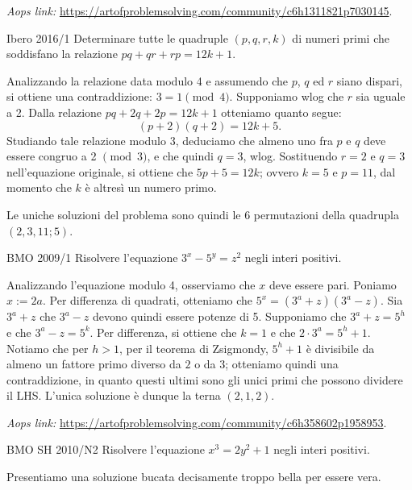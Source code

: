 \documentclass{article}
\begin{document}
\vspace{0.5cm}
\textit{Aops link:}
\href{https://artofproblemsolving.com/community/c6h1311821p7030145}
{https://artofproblemsolving.com/community/c6h1311821p7030145}.

\begin{proposition}{Ibero 2016/1}{}
	Determinare tutte le quadruple $(p,q,r,k)$ di numeri primi
	che soddisfano la relazione $pq+qr+rp=12k+1$.
\end{proposition}

Analizzando la relazione data modulo 4 e assumendo
che $p$, $q$ ed $r$ siano dispari, si ottiene una contraddizione:
$3=1 \pmod{4}$. Supponiamo wlog che $r$ sia uguale a 2.
Dalla relazione $pq+2q+2p=12k+1$ otteniamo quanto segue:
\begin{equation*}
	(p+2)(q+2)=12k+5.
\end{equation*}
Studiando tale relazione modulo 3, deduciamo che almeno uno fra
$p$ e $q$ deve essere congruo a 2 $\pmod{3}$, e che quindi
$q=3$, wlog.
Sostituendo $r=2$ e $q=3$ nell'equazione originale, si ottiene
che $5p+5=12k$; ovvero $k=5$ e $p=11$, dal momento che $k$ è
altresì un numero primo.

Le uniche soluzioni del problema sono quindi le
6 permutazioni della quadrupla $(2, 3, 11; 5)$.

\begin{proposition}{BMO 2009/1}{}
	Risolvere l'equazione $3^x-5^y=z^2$ negli interi positivi.
\end{proposition}

Analizzando l'equazione modulo 4, osserviamo che $x$ deve essere pari.
Poniamo $x:=2a$. Per differenza di quadrati, otteniamo che
$5^x=(3^a+z)(3^a-z)$. Sia $3^a+z$ che $3^a-z$ devono quindi essere
potenze di 5. Supponiamo che $3^a+z=5^h$ e che $3^a-z=5^k$.
Per differenza, si ottiene che $k=1$ e che $2\cdot 3^a=5^h+1$. Notiamo che
per $h>1$,
per il teorema di Zsigmondy, $5^h+1$ è divisibile da almeno un fattore primo
diverso da $2$ o da $3$; otteniamo quindi una contraddizione, in quanto
questi ultimi sono gli unici primi che possono dividere il LHS.
L'unica soluzione è dunque la terna $(2,1,2)$.

\vspace{0.5cm}
\textit{Aops link:}
\href{https://artofproblemsolving.com/community/c6h358602p1958953}
{https://artofproblemsolving.com/community/c6h358602p1958953}.

\begin{proposition}{BMO SH 2010/N2}{}
	Risolvere l'equazione $x^3=2y^2+1$ negli interi positivi.
\end{proposition}
Presentiamo una soluzione bucata decisamente troppo bella per essere vera.
\end{document}
